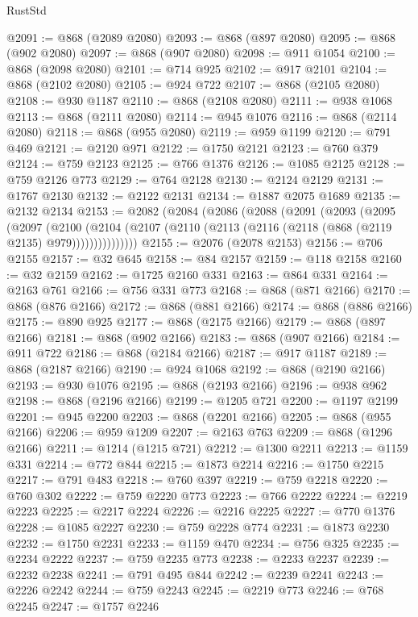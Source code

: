 \begin{lexlean}{RustStd}
\begin{coremodule}
@2091 := @868 (@2089 @2080)
@2093 := @868 (@897 @2080)
@2095 := @868 (@902 @2080)
@2097 := @868 (@907 @2080)
@2098 := @911 @1054
@2100 := @868 (@2098 @2080)
@2101 := @714 @925
@2102 := @917 @2101
@2104 := @868 (@2102 @2080)
@2105 := @924 @722
@2107 := @868 (@2105 @2080)
@2108 := @930 @1187
@2110 := @868 (@2108 @2080)
@2111 := @938 @1068
@2113 := @868 (@2111 @2080)
@2114 := @945 @1076
@2116 := @868 (@2114 @2080)
@2118 := @868 (@955 @2080)
@2119 := @959 @1199
@2120 := @791 @469
@2121 := @2120 @971
@2122 := @1750 @2121
@2123 := @760 @379
@2124 := @759 @2123
@2125 := @766 @1376
@2126 := @1085 @2125
@2128 := @759 @2126 @773
@2129 := @764 @2128
@2130 := @2124 @2129
@2131 := @1767 @2130
@2132 := @2122 @2131
@2134 := @1887 @2075 @1689
@2135 := @2132 @2134
@2153 := @2082
    (@2084
      (@2086
        (@2088
          (@2091
            (@2093
              (@2095
                (@2097
                  (@2100
                    (@2104
                      (@2107 (@2110 (@2113 (@2116 (@2118 (@868 (@2119 @2135) @979)))))))))))))))
@2155 := @2076 (@2078 @2153)
@2156 := @706 @2155
@2157 := @32 @645
@2158 := @84 @2157
@2159 := @118 @2158
@2160 := @32 @2159
@2162 := @1725 @2160 @331
@2163 := @864 @331
@2164 := @2163 @761
@2166 := @756 @331 @773
@2168 := @868 (@871 @2166)
@2170 := @868 (@876 @2166)
@2172 := @868 (@881 @2166)
@2174 := @868 (@886 @2166)
@2175 := @890 @925
@2177 := @868 (@2175 @2166)
@2179 := @868 (@897 @2166)
@2181 := @868 (@902 @2166)
@2183 := @868 (@907 @2166)
@2184 := @911 @722
@2186 := @868 (@2184 @2166)
@2187 := @917 @1187
@2189 := @868 (@2187 @2166)
@2190 := @924 @1068
@2192 := @868 (@2190 @2166)
@2193 := @930 @1076
@2195 := @868 (@2193 @2166)
@2196 := @938 @962
@2198 := @868 (@2196 @2166)
@2199 := @1205 @721
@2200 := @1197 @2199
@2201 := @945 @2200
@2203 := @868 (@2201 @2166)
@2205 := @868 (@955 @2166)
@2206 := @959 @1209
@2207 := @2163 @763
@2209 := @868 (@1296 @2166)
@2211 := @1214 (@1215 @721)
@2212 := @1300 @2211
@2213 := @1159 @331
@2214 := @772 @844
@2215 := @1873 @2214
@2216 := @1750 @2215
@2217 := @791 @483
@2218 := @760 @397
@2219 := @759 @2218
@2220 := @760 @302
@2222 := @759 @2220 @773
@2223 := @766 @2222
@2224 := @2219 @2223
@2225 := @2217 @2224
@2226 := @2216 @2225
@2227 := @770 @1376
@2228 := @1085 @2227
@2230 := @759 @2228 @774
@2231 := @1873 @2230
@2232 := @1750 @2231
@2233 := @1159 @470
@2234 := @756 @325
@2235 := @2234 @2222
@2237 := @759 @2235 @773
@2238 := @2233 @2237
@2239 := @2232 @2238
@2241 := @791 @495 @844
@2242 := @2239 @2241
@2243 := @2226 @2242
@2244 := @759 @2243
@2245 := @2219 @773
@2246 := @768 @2245
@2247 := @1757 @2246

\end{coremodule}
\end{lexlean}
